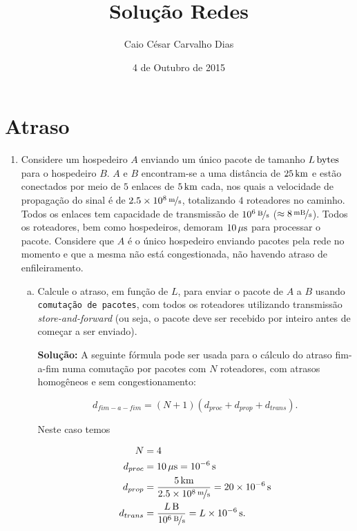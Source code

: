\documentclass{article}
\title{Solução Redes}
\author{Caio César Carvalho Dias}
\date{4 de Outubro de 2015}
\begin{document}
\maketitle

\section*{Atraso}
\begin{enumerate}
\item 
Considere um hospedeiro $A$ enviando um único pacote de tamanho $\unit[L]{bytes}$ para o hospedeiro $B$. $A$ e $B$ encontram-se a uma distância de $\unit[25]{km}$ e estão conectados por meio de $5$ enlaces de $\unit[5]{km}$ cada, nos quais a velocidade de propagação do sinal é de $\unitfrac[2.5 \times 10^8]{m}{s}$, totalizando $4$ roteadores no caminho. Todos os enlaces tem capacidade de transmissão de $\unitfrac[10^6]{B}{s}$ ($\approx \unitfrac[8]{mB}{s}$). Todos os roteadores, bem como hospedeiros, demoram $\unit[10]{\mu s}$ para processar o pacote. Considere que $A$ é o único hospedeiro enviando pacotes pela rede no momento e que a mesma não está congestionada, não havendo atraso de enfileiramento.

\begin{enumerate}[a)]
\item Calcule o atraso, em função de $L$, para enviar o pacote de $A$ a $B$ usando \texttt{comutação de pacotes}, com todos os roteadores utilizando transmissão \textit{store-and-forward} (ou seja, o pacote deve ser recebido por inteiro antes de começar a ser enviado).

\begin{addmargin}[0.5in]{0.5in}
\par \textbf{Solução:} A seguinte fórmula pode ser usada para o cálculo do atraso fim-a-fim numa comutação por pacotes com $N$ roteadores, com atrasos homogêneos e sem congestionamento:

$$d_{fim-a-fim} = (N + 1)(d_{proc} + d_{prop} + d_{trans}).$$

Neste caso temos

\begin{equation} \label{eq1}
\begin{split}
N & = 4 \\
d_{proc} & = \unit[10]{\mu s} = \unit[10^{-6}]{s}\\
d_{prop} & = \frac{\unit[5]{km}}{\unitfrac[2.5 \times 10^8]{m}{s}} = \unit[20 \times 10^{-6}]{s}\\
d_{trans} & = \frac{\unit[L]{B}}{\unitfrac[10^6]{B}{s}} = \unit[L \times 10^{-6}]{s}.
\end{split}
\end{equation}


\end{addmargin}
\end{enumerate}
\end{enumerate}
\end{document}
